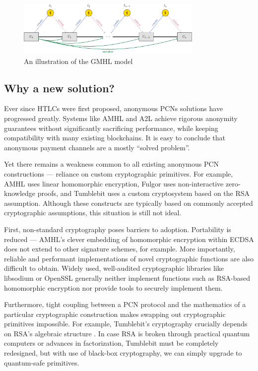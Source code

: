 \documentclass[USenglish,oneside,twocolumn]{article}
\begin{document}
\begin{figure}
    \centering
    \includegraphics[width=0.8\textwidth]{graphics/coinpassing.pdf}
    \caption{An illustration of the GMHL model}
    \label{fig:coinpassing}
\end{figure}

\subsection{Why a new solution?}

Ever since HTLCs were first proposed, anonymous PCNs solutions have progressed greatly. Systems like AMHL and A2L achieve rigorous anonymity guarantees without significantly sacrificing performance, while keeping compatibility with many existing blockchains. It is easy to conclude that anonymous payment channels are a mostly ``solved problem''.

Yet there remains a weakness common to all existing anonymous PCN constructions --- reliance on custom cryptographic primitives. For example, AMHL uses linear homomorphic encryption, Fulgor uses non-interactive zero-knowledge proofs, and Tumblebit uses a custom cryptosystem based on the RSA assumption. Although these constructs are typically based on commonly accepted cryptographic assumptions, this situation is still not ideal.

First, non-standard cryptography poses barriers to adoption. Portability is reduced --- AMHL's clever embedding of homomorphic encryption within ECDSA does not extend to other signature schemes, for example. More importantly, reliable and performant implementations of novel cryptographic functions are also difficult to obtain. Widely used, well-audited cryptographic libraries like libsodium \cite{libsodium} or OpenSSL \cite{openssl} generally neither implement functions such as RSA-based homomorphic encryption nor provide tools to securely implement them.

Furthermore, tight coupling between a PCN protocol and the mathematics of a particular cryptographic construction makes swapping out cryptographic primitives impossible. For example, Tumblebit's cryptography crucially depends on RSA's algebraic structure \cite{heilman2017tumblebit}. In case RSA is broken through practical quantum computers or advances in factorization, Tumblebit must be completely redesigned, but with use of black-box cryptography, we can simply upgrade to quantum-safe primitives.
\end{document}

